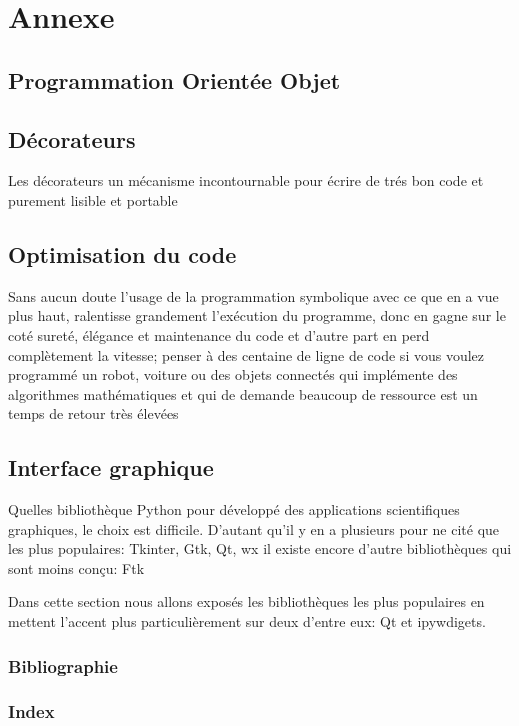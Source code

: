 \documentclass[11pt,fleqn]{book} %
\begin{document}
\part{Annexe}

\chapter{Programmation Orientée Objet}
\chapter{D\'ecorateurs}
Les d\'ecorateurs un m\'ecanisme incontournable pour \'ecrire de tr\'es bon code et purement 
lisible et portable
\chapter{Optimisation du code}
Sans aucun doute l'usage de la programmation symbolique avec ce que en a vue plus haut, ralentisse 
grandement l'exécution du programme, donc en gagne sur le coté sureté, élégance
et maintenance du code et d'autre part en perd complètement la vitesse; penser à des centaine de ligne 
de code si vous voulez programmé un robot, voiture ou des objets connectés qui implémente des 
algorithmes mathématiques et qui de demande beaucoup de ressource est un temps de retour très élevées 



\chapter{Interface graphique}
Quelles bibliothèque Python pour développé des applications scientifiques graphiques, le choix est 
difficile. D'autant qu'il y en a plusieurs pour ne cité que les plus populaires: Tkinter, Gtk, Qt, wx  
il existe encore d'autre bibliothèques qui sont moins con\c{c}u: Ftk 

Dans cette section nous allons exposés les bibliothèques les plus populaires en mettent l'accent plus particulièrement sur deux d'entre eux: Qt et ipywdigets. 

\section{Bibliographie}
\section{Index}
\end{document}

